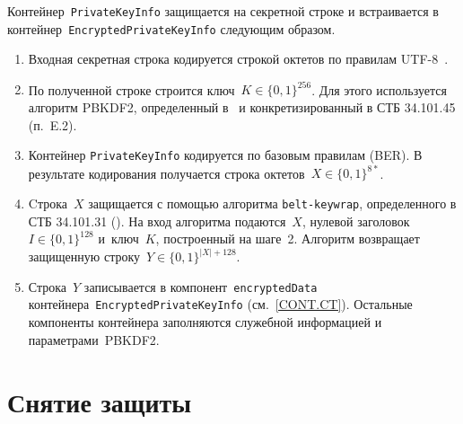 Контейнер~\texttt{PrivateKeyInfo} защищается на секретной строке и
встраивается в контейнер~\texttt{EncryptedPrivateKeyInfo} следующим
образом.
\begin{enumerate}
\item
Входная секретная строка кодируется строкой октетов по правилам 
UTF-8~\cite{UTF8}. 
\item
По полученной строке строится ключ~$K\in\{0,1\}^{256}$.
Для этого используется алгоритм PBKDF2, определенный в~\cite{PKCS5} и 
конкретизированный в СТБ 34.101.45 (п.~E.2).
\item
Контейнер \texttt{PrivateKeyInfo} кодируется по базовым правилам (BER).
В результате кодирования получается строка октетов~$X\in\{0,1\}^{8*}$.
\item
Cтрока~$X$ защищается с помощью алгоритма \texttt{belt-keywrap}, 
определенного в СТБ 34.101.31 (). На вход алгоритма подаются~$X$, нулевой 
заголовок~$I\in\{0,1\}^{128}$ и~ключ~$K$, построенный на шаге~2. Алгоритм 
возвращает защищенную строку~$Y\in\{0,1\}^{|X|+128}$. 
\item
Строка~$Y$ записывается в компонент~\texttt{encryptedData}
контейнера~\texttt{EncryptedPrivateKeyInfo} (см.~\ref{CONT.CT}).
Остальные компоненты контейнера
заполняются служебной информацией и параметрами~PBKDF2.
\end{enumerate}

\section{Снятие защиты}\label{CONT.Unwrap}

